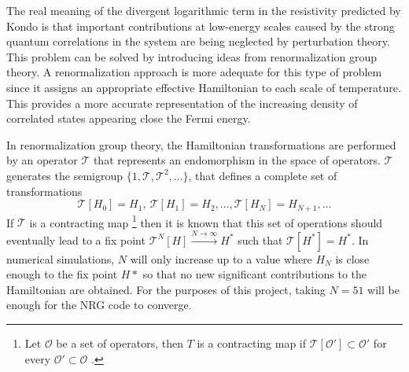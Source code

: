  The real meaning of the divergent logarithmic term in the resistivity predicted by Kondo is that important contributions at low-energy scales caused by the strong quantum correlations in the system are being neglected by perturbation theory. This problem can be solved by introducing ideas from renormalization group theory. A renormalization approach is more adequate for this type of problem since it assigns an appropriate effective Hamiltonian to each scale of temperature. This provides a more accurate representation of the increasing density of correlated states appearing close the Fermi energy. 

In renormalization group theory, the Hamiltonian transformations are performed by an operator $\mathcal{T}$ that represents an endomorphism in the space of operators. $\mathcal{T}$ generates the semigroup  $\{ 1, \mathcal{T} , \mathcal{T}^2 , \ldots \}$, that defines a complete set of transformations   %
$$ \mathcal{T}[H_0] = H_1, \  \mathcal{T}[H_1] = H_2, \ldots , \mathcal{T}[H_N] = H_{N+1} , \ldots$$
\noindent If $\mathcal{T}$ is a contracting map  \footnote{ Let $\mathcal{O}$ be a set of operators, then $T$ is a contracting map if $\mathcal{T}[\mathcal{O'} ] \subset \mathcal{O'}$ for every $\mathcal{O'} \subset \mathcal{O}$ .} then it is known that this set of operations should eventually lead to a fix point $ \mathcal{T}^N[H] \xrightarrow{N\rightarrow\infty} H^*$ such that $\mathcal{T}[H^*] = H^*$. In numerical simulations, $N $ will only increase up to a value where $H_N$ is close enough to the fix point $H*$ so that no new significant contributions to the Hamiltonian are obtained. For the purposes of this project, taking $N = 51$ will be enough  for the NRG code to converge. 


